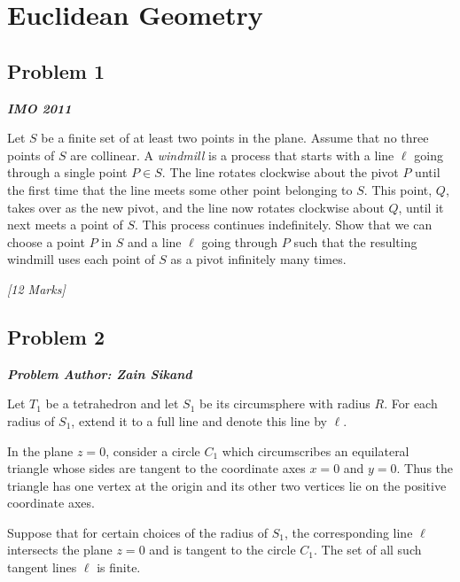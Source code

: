 \documentclass[openany,oneside,12pt,hidelinks]{book}
\newcommand{\problemmeta}[1]{%
  \begin{cataloguebox}\textbf{\emph{#1}}\end{cataloguebox}%
}
\begin{document}
\newpage

\section{Euclidean Geometry}

\subsection{Problem 1}

\problemmeta{IMO 2011}

Let \(S\) be a finite set of at least two points in the plane. Assume that no
three points of \(S\) are collinear. A \emph{windmill} is a process that starts
with a line \(\ell\) going through a single point \(P \in S\). The line rotates
clockwise about the pivot \(P\) until the first time that the line meets some
other point belonging to \(S\). This point, \(Q\), takes over as the new pivot,
and the line now rotates clockwise about \(Q\), until it next meets a point of
\(S\). This process continues indefinitely. Show that we can choose a point \(P\)
in \(S\) and a line \(\ell\) going through \(P\) such that the resulting windmill uses
each point of \(S\) as a pivot infinitely many times.

\hfill\textit{[12 Marks]}


\subsection{Problem 2}

\problemmeta{Problem Author: Zain Sikand}

Let \(T_{1}\) be a tetrahedron and let \(S_{1}\) be its circumsphere with radius
\(R\). For each radius of \(S_{1}\), extend it to a full line and denote this line
by \(\ell\).

In the plane \(z = 0\), consider a circle \(C_{1}\) which circumscribes an
equilateral triangle whose sides are tangent to the coordinate axes \(x = 0\)
and \(y = 0\). Thus the triangle has one vertex at the origin and its other two
vertices lie on the positive coordinate axes.

Suppose that for certain choices of the radius of \(S_{1}\), the corresponding
line \(\ell\) intersects the plane \(z = 0\) and is tangent to the circle \(C_{1}\).
The set of all such tangent lines \(\ell\) is finite.
\end{document}
